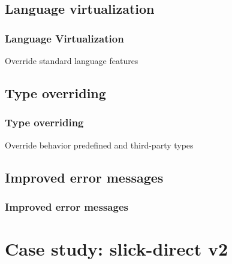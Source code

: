 \documentclass[xcolor=dvipsnames]{beamer}
\theoremstyle{definition}
\begin{document}

\subsection{Language virtualization} %
\label{sub:Languagevirtualization}
\begin{frame}[fragile]
    \frametitle{Language Virtualization}
    \begin{block}{Override standard language features}
        
    \end{block}
\end{frame}


\subsection{Type overriding} %
\label{sub:Typeoverriding}

\begin{frame}[fragile]
    \frametitle{Type overriding}
    \begin{block}{Override behavior predefined and third-party types}
        
    \end{block}
\end{frame}


\subsection{Improved error messages} %
\label{sub:Improvederrormessages}
\begin{frame}[fragile]
    \frametitle{Improved error messages}
    \begin{block}{}
        
    \end{block}
\end{frame}




\section{Case study: slick-direct v2} %
\label{sec:Slick-direct}
\end{document}
